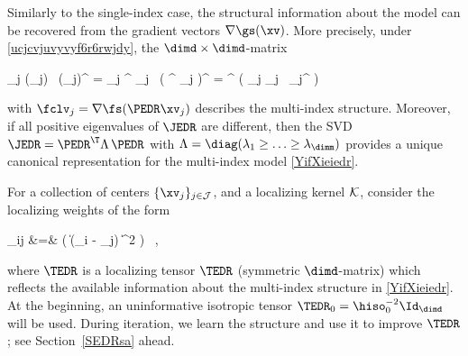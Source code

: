 Similarly to the single-index case, 
the structural information about the model
can be recovered from the gradient vectors \( \nabla \gs(\xv) \).
More precisely, under \eqref{ucjcvjuvyvyf6r6rwjdy}, the \( \dimd \times \dimd \)-matrix
\begin{EQA}[c]
	\JEDR
	\eqdef
	\sum_{j \in \JJJ} \nabla \gs(\xv_{j}) \, \nabla \gs(\xv_{j})^{\T}
	=
	\sum_{j \in \JJJ} \PEDR^{\T} \fclv_{j} \, \bigl( \PEDR^{\T} \fclv_{j} \bigr)^{\T}
	=
	\PEDR^{\T} \biggl( \sum_{j \in \JJJ} \fclv_{j} \, \fclv_{j}^{\T} \biggr) \PEDR
	\, 
\label{ihjfiojihfer6t4rrt}
\end{EQA}
with \( \fclv_{j} = \nabla \fs(\PEDR \xv_{j}) \)
describes the multi-index structure.
Moreover, 
if all positive eigenvalues of \( \JEDR \) are different, 
then the SVD \( \JEDR = \PEDR^{\T} \Lambda \, \PEDR \) with \( \Lambda = \diag(\lambda_{1} \geq \ldots \geq \lambda_{\dimm}) \)
provides a unique canonical representation for the multi-index model \eqref{YifXieiedr}.


For a collection of centers \( \{ \xv_{j} \}_{j \in \JJJ} \),
and a localizing kernel \( \mathcal{K} \), consider the localizing weights of the form
\begin{EQA}
	\weight_{ij}
	&=&
	\Kern\bigl( \| \TEDR(\Xv_{i} - \xv_{j}) \|^{2} \bigr) 
	\, ,
\label{s7cuqkdwywdhbjwbfjwbdjm}
\end{EQA}
where \( \TEDR \) is a localizing tensor \( \TEDR \) (symmetric \( \dimd \)-matrix)
which reflects the available information about the multi-index structure in \eqref{YifXieiedr}.
At the beginning, an uninformative isotropic tensor \( \TEDR_{0} = \hiso_{0}^{-2} \Id_{\dimd} \) will be used.
During iteration, we learn the structure and use it to improve \( \TEDR \); see Section~\ref{SEDRsa} ahead.

